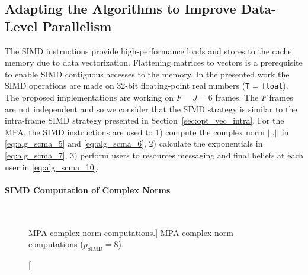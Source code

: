 \subsection{Adapting the Algorithms to Improve Data-Level Parallelism}
\label{sec:opt_scma_adapting_algorithms}

The SIMD instructions provide high-performance loads and stores to the cache
memory due to data vectorization. Flattening matrices to vectors is a
prerequisite to enable SIMD contiguous accesses to the memory. In the presented
work the SIMD operations are made on 32-bit floating-point real numbers
(\verb|T| = \verb|float|). The proposed implementations are working on
$F = J = 6$ frames. The $F$ frames are not independent and so we consider that
the SIMD strategy is similar to the intra-frame SIMD strategy presented in
Section~\ref{sec:opt_vec_intra}.
For the MPA, the SIMD instructions are used to 1) compute the complex norm
$||.||$ in \eqref{eq:alg_scma_5} and \eqref{eq:alg_scma_6}, 2) calculate the
exponentials in \eqref{eq:alg_scma_7}, 3) perform users to resources messaging
and final beliefs at each user in \eqref{eq:alg_scma_10}.

\paragraph{SIMD Computation of Complex Norms}

\begin{figure}[htp]
  \centering
  \\
  \caption
    [MPA complex norm computations.]
    {MPA complex norm computations ($p_\text{SIMD} = 8$).}
  \label{fig:opt_scma_simd_norm}
\end{figure}

